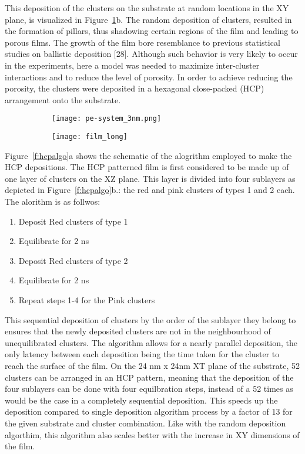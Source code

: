 \begin{selfcite}
This deposition of the clusters on the substrate at random locations in the XY plane, is visualized in Figure~\ref{f:random_multi}b. The random deposition of clusters, resulted in the formation of pillars, thus shadowing certain regions of the film and leading to porous films. The growth of the film bore resemblance to previous statistical studies on ballistic deposition [28]. Although such behavior is very likely to occur in the experiments, here a model was needed to maximize inter-cluster interactions and to reduce the level of porosity. In order to achieve reducing the porosity, the clusters were deposited in a hexagonal close-packed (HCP) arrangement onto the substrate.

\begin{figure}[!ht]
	\centering
	\begin{subfigure}{0.50\textwidth} \texttt{[image: pe-system\_3nm.png]}
	\subcaption{} \end{subfigure}%
	\hfill
	\begin{subfigure}{0.50\textwidth} \texttt{[image: film\_long]}
	\subcaption{} \end{subfigure}%
	\label{f:random_multi}
\end{figure}

Figure~\ref{f:hcpalgo}a shows the schematic of the alogrithm employed to make the HCP depositions. The HCP patterned film is first considered to be made up of one layer of clusters on the XZ plane. This layer is divided into four sublayers as depicted in Figure~\ref{f:hcpalgo}b.: the red and pink clusters of types 1 and 2 each. The alorithm is as follwos:

\begin{enumerate}
	\item Deposit Red clusters of type 1
	\item Equilibrate for 2 ns
	\item Deposit Red clusters of type 2
	\item Equilibrate for 2 ns
	\item Repeat steps 1-4 for the Pink clusters
\end{enumerate}

This sequential deposition of clusters by the order of the sublayer they belong to ensures that the newly deposited clusters are not in the neighbourhood of unequilibrated clusters. The algorithm allows for a nearly parallel deposition, the only latency between each deposition being the time taken for the cluster to reach the surface of the film. On the 24 nm x 24nm XT plane of the substrate, 52 clusters can be arranged in an HCP pattern, meaning that the deposition of the four sublayers can be done with four equilbration steps, instead of a 52 times as would be the case in a completely sequential deposition. This speeds up the deposition compared to single deposition algorithm process by a factor of 13 for the given substrate and cluster combination. Like with the random deposition algorthim, this algorithm also scales better with the increase in XY dimensions of the film. \par


\end{selfcite}
